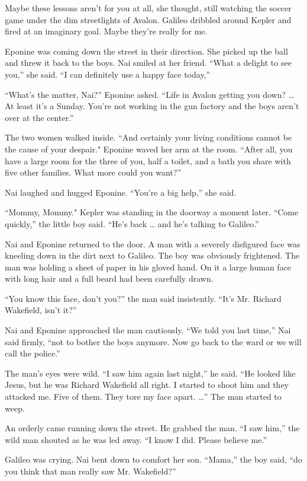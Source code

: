 \documentclass[]{article}
\begin{document}
{{Maybe these lessons aren’t for you at all, she thought, still watching the soccer game under the dim streetlights of Avalon.  Galileo dribbled around Kepler and fired at an imaginary goal.  Maybe they’re really for me.

Eponine was coming down the street in their direction.  She picked up the ball and threw it back to the boys.  Nai smiled at her friend.  “What a delight to see you,” she said.  “I can definitely use a happy face today,”

“What’s the matter, Nai?” Eponine asked.  “Life in Avalon getting you down? … At least it’s a Sunday.  You’re not working in the gun factory and the boys aren’t over at the center.”

The two women walked inside.  “And certainly your living conditions cannot be the cause of your despair."  Eponine waved her arm at the room.  “After all, you have a large room for the three of you, half a toilet, and a bath you share with five other families.  What more could you want?”

Nai laughed and hugged Eponine.  “You’re a big help,” she said.

“Mommy, Mommy."  Kepler was standing in the doorway a moment later.  “Come quickly,” the little boy said.  “He’s back … and he’s talking to Galileo.”

Nai and Eponine returned to the door.  A man with a severely disfigured face was kneeling down in the dirt next to Galileo.  The boy was obviously frightened.  The man was holding a sheet of paper in his gloved hand.  On it a large human face with long hair and a full beard had been carefully drawn.

“You know this face, don’t you?” the man said insistently.  “It’s Mr.  Richard Wakefield, isn’t it?”

Nai and Eponine approached the man cautiously.  “We told you last time,” Nai said firmly, “not to bother the boys anymore.  Now go back to the ward or we will call the police.”

The man’s eyes were wild.  “I saw him again last night,” he said.  “He looked like Jesus, but he was Richard Wakefield all right.  I started to shoot him and they attacked me.  Five of them.  They tore my face apart.  …” The man started to weep.

An orderly came running down the street.  He grabbed the man.  “I saw him,” the wild man shouted as he was led away.  “I know I did.  Please believe me.”

Galileo was crying.  Nai bent down to comfort her son.  “Mama,” the boy said, “do you think that man really saw Mr.  Wakefield?”

}}
\end{document}
